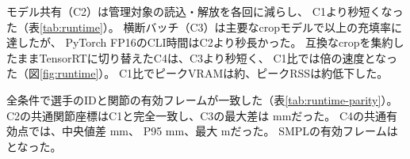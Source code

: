 モデル共有（C2）は管理対象の読込・解放を各回に減らし、
C1より秒短くなった（表\ref{tab:runtime}）。
横断バッチ（C3）は主要なcropモデルで以上の充填率に達したが、
PyTorch FP16のCLI時間はC2より秒長かった。
互換なcropを集約したままTensorRTに切り替えたC4は、C3より秒短く、
C1比では倍の速度となった（図\ref{fig:runtime}）。
C1比でピークVRAMは約、ピークRSSは約低下した。

\begin{table}[tbp]
\centering
\caption{実行条件別の関節座標と身体被覆の整合。C1と対応した選手の共通有効関節点を比較。
座標差はコート座標での距離、SMPLは元時間軸の有効な選手フレーム数。}
\label{tab:runtime-parity}
\small

\end{table}

全条件で選手のIDと関節の有効フレームが一致した（表\ref{tab:runtime-parity}）。
C2の共通関節座標はC1と完全一致し、C3の最大差は mmだった。
C4の共通有効点では、中央値差 mm、
P95  mm、最大 mだった。
SMPLの有効フレームはとなった。
\FloatBarrier

